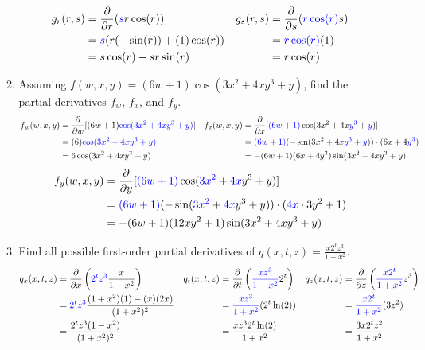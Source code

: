 \documentclass[10pt]{article}
\newenvironment{red}{\color{red}}{\ignorespacesafterend}
\newcommand{\blue}[1]{\textcolor{blue}{#1}}
\begin{document}
\begin{enumerate}[leftmargin=0pt]
\begin{enumerate}
\begin{red}
\begin{align*}
            g_r(r,s) &= \frac{\partial}{\partial r} (\blue{s} r\cos(r)) &
            g_s(r,s) &= \frac{\partial}{\partial s} (\blue{r \cos(r)} s) \\
            &= \blue{s}(r(-\sin(r)) + (1)\cos(r)) &
            &= \blue{r \cos(r)} (1) \\
            &= s\cos(r) - sr\sin(r) &
            &= r\cos(r)
        \end{align*}
    \end{red}
    \item Assuming $f(w,x,y) = (6w+1)\cos(3x^2+4xy^3+y)$, find the partial derivatives $f_w$, $f_x$, and $f_y$.
    \begin{red}
        \begin{align*}
            f_w(w,x,y) &= \frac{\partial}{\partial w} [(6w+1)\blue{\cos(3x^2+4xy^3+y)}] &
            f_x(w,x,y) &= \frac{\partial}{\partial x} [\blue{(6w+1)} \cos(3x^2+4x\blue{y^3}+\blue{y})] \\
            &= (6)\blue{\cos(3x^2+4xy^3+y)} &
            &= \blue{(6w+1)}(-\sin(3x^2+4x\blue{y^3}+\blue{y}))\cdot(6x+4\blue{y^3}) \\
            &= 6\cos(3x^2+4xy^3+y) &
            &= -(6w+1)(6x+4y^3)\sin(3x^2+4xy^3+y) \\
        \end{align*}
        \begin{align*}
            f_y(w,x,y) &= \frac{\partial}{\partial y} [\blue{(6w+1)}\cos(\blue{3x^2}+\blue{4x}y^3+y)] \\
            &= \blue{(6w+1)}(-\sin(\blue{3x^2}+\blue{4x}y^3+y))\cdot(\blue{4x}\cdot 3y^2 + 1) \\
            &= -(6w+1)(12xy^2+1)\sin(3x^2+4xy^3+y)
        \end{align*}
    \end{red}
    \item Find all possible first-order partial derivatives of $q(x,t,z) =
    \displaystyle \frac{x2^tz^3}{1+x^2}$.
    \begin{red}
        \begin{align*}
            q_x(x,t,z) &= \frac{\partial}{\partial x}\left(\blue{2^tz^3}\frac{x}{1+x^2}\right) &
            q_t(x,t,z) &= \frac{\partial}{\partial t}\left(\blue{\frac{xz^3}{1+x^2}}2^t\right) &
            q_z(x,t,z) &= \frac{\partial}{\partial z}\left(\blue{\frac{x2^t}{1+x^2}}z^3\right) \\
            &= \blue{2^tz^3}\frac{(1+x^2)(1) - (x)(2x)}{(1+x^2)^2} &
            &= \blue{\frac{xz^3}{1+x^2}}(2^t\ln(2)) &
            &= \blue{\frac{x2^t}{1+x^2}}(3z^2) \\
            &= \frac{2^t z^3 (1-x^2)}{(1+x^2)^2} &
            &= \frac{x z^3 2^t \ln(2)}{1+x^2} &
            &= \frac{3x 2^t z^2}{1+x^2}
        \end{align*}
    \end{red}
\end{enumerate}


\end{enumerate}
\end{document}
